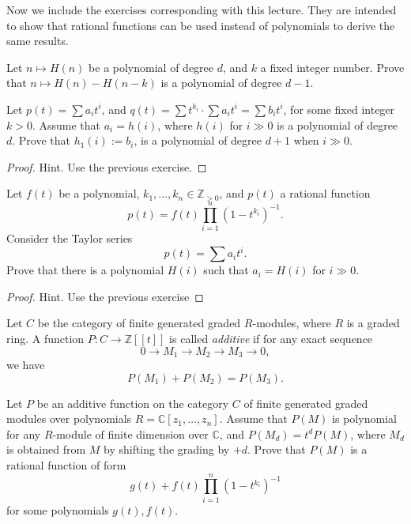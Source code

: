 \medskip\noindent
Now we include the exercises corresponding
with this lecture. They are intended
to show that rational functions
can be used instead of polynomials
to derive the same results.

\begin{exercise}
\label{exercise-poincare-10-1}
Let $n\mapsto H(n)$ be a polynomial of
degree $d$, and $k$ a fixed integer number.
Prove that
$n\mapsto H(n)-H(n-k)$ is a polynomial of
degree $d-1$.
\end{exercise}

\begin{exercise}
\label{exercise-poincare-10-2}
Let $p(t)=\sum a_i t^i$, and
$q(t)=\sum t^{k_i}\cdot \sum a_i t^i
=\sum b_i t^i$, for some fixed integer
$k>0$.
Assume that $a_i=h(i)$, where $h(i)$ for
$i\gg 0$ is a polynomial of degree $d$.
Prove that $h_1(i):=b_i$, is a polynomial of
degree $d+1$ when $i\gg 0$.
\end{exercise}

\begin{proof}
Hint. Use the previous exercise.
\end{proof}

\begin{exercise}
\label{exercise-poincare-10-3}
Let $f(t)$ be a polynomial, $k_1, \dots,
k_n\in \mathbb{Z}_{>0}$, and $p(t)$ a
rational function
$$
p(t)=f(t)\prod_{i=1}^n(1-t^{k_i})^{-1}.
$$
Consider the Taylor series
$$
p(t)=\sum a_i t^i.
$$
Prove that there is a polynomial $H(i)$
such that $a_i=H(i)$ for $i\gg 0$.
\end{exercise}

\begin{proof}
Hint. Use the previous exercise
\end{proof}

\begin{definition}
\label{definition-graded-modules-additive}
Let $C$ be the category of finite generated
graded $R$-modules, where $R$ is a graded
ring.
A function $P:C\to \mathbb{Z}[[t]]$ is
called {\it additive} if for any exact
sequence
$$
0\to M_1\to M_2\to M_3\to 0,
$$
we have
$$
P(M_1)+P(M_2)=P(M_3).
$$
\end{definition}

\begin{exercise}
\label{exercise-poincare-10-4}
Let $P$ be an additive function on the
category $C$ of finite generated graded
modules over polynomials
$R=\mathbb{C}[z_1,\dots,z_n]$.
Assume that $P(M)$ is polynomial for any
$R$-module of finite dimension over
$\mathbb{C}$, and $P(M_d)=t^dP(M)$, where
$M_d$ is obtained from $M$ by shifting the
grading by $+d$.
Prove that $P(M)$ is a rational function of
form
$$
g(t)+f(t)\prod_{i=1}^n(1-t^{k_i})^{-1}
$$
for some polynomials $g(t),f(t)$.
\end{exercise}

